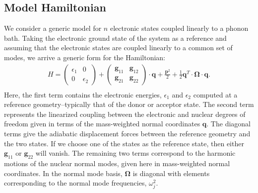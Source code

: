 \subsection{Model Hamiltonian}
We consider a generic model for $n$ electronic states coupled linearly
to a phonon bath.  Taking the electronic ground state of the system as a reference
and assuming that the electronic states are coupled linearly to a common set of
 modes, we arrive a generic form for the Hamiltonian:
 \begin{eqnarray}
H=\left(\begin{array}{cc}
\epsilon_{1} & 0\\
0 & \epsilon_{2}
\end{array}\right)+\left(\begin{array}{cc}
{\mathbf g}_{11}&{\mathbf g}_{12} \\
{\mathbf g}_{21} &{\mathbf g}_{22}
\end{array}\right)\cdot{\mathbf q} +\frac{{\mathbf p}^{2}}{2}+\frac{1}{2}\mathbf{q}^{T}\cdot\mathbf\Omega\cdot\mathbf{q}.
\nonumber \\
\label{ham1}
\end{eqnarray}
Here, the first term contains the electronic energies, $\epsilon_{1}$ and $\epsilon_{2}$ computed at a
reference geometry--typically that of the donor or acceptor state.   The second term represents the
linearized coupling between the electronic and nuclear degrees of freedom given in terms of the mass-weighted
normal coordinates $\mathbf q$.   The diagonal terms
give the adiabatic displacement forces between the reference geometry and the two states.  If we choose one of the
states as the reference state, then either $\mathbf g_{11}$ or $\mathbf g_{22}$ will vanish.
The remaining two terms correspond to the harmonic motions of the nuclear normal modes, given here in mass-weighted normal coordinates.
In the normal mode basis, $\mathbf \Omega$  is diagonal with elements corresponding to the normal mode frequencies, $\omega_{j}^{2}$.

